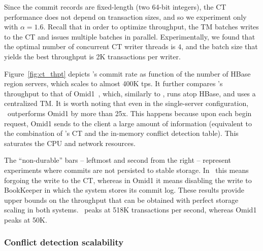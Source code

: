 Since the commit records are fixed-length (two 64-bit integers), the CT performance does not depend on transaction sizes, and 
so we experiment only with $\alpha=1.6$.
Recall that in order to optimize throughput, the TM batches writes to the CT and issues multiple batches in parallel. 
Experimentally, we found that the optimal number of concurrent CT writer threads is $4$, and  
the batch size that yields the best throughput is 2K transactions per writer. 

Figure~\ref{fig:ct_thpt} depicts \sys's commit rate as function of the number of HBase region servers,
which scales to almost 400K tps.
It further compares \sys's throughput to that of  Omid1~\cite{OmidICDE2014}, which, 
similarly to \sys, runs atop HBase, and uses a centralized TM. 
It is worth noting that even in the single-server configuration, \sys\ outperforms
Omid1  by more than 25x. This happens because upon each begin request, Omid1 sends to the client a large amount 
of information (equivalent to the combination of \sys's CT and the in-memory conflict detection table). 
This saturates the CPU and network resources. 

The ``non-durable'' bars -- leftmost and second from the right -- represent experiments where commits are not persisted 
to stable storage. In \sys\ this means forgoing the write to the CT, whereas in Omid1 it means disabling the write to BookKeeper
in which the system stores its commit log.  
These results provide upper bounds on the throughput that can be obtained with perfect storage scaling in both systems. 
\sys\ peaks at 518K transactions per second, whereas Omid1 peaks at 50K. 


\subsubsection{Conflict detection scalability} 
\label{ssec:mc-scale}



